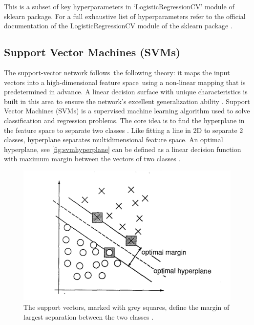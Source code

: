 This is a subset of key hyperparameters in `LogisticRegressionCV' module of sklearn package. For a full exhaustive list of hyperparameters refer to the official documentation of the LogisticRegressionCV module of the sklearn package \citep{sklearn_api}.


\subsection{Support Vector Machines (SVMs)}
The support-vector network follows the following theory: it maps the input vectors into a high-dimensional feature space using a non-linear mapping that is predetermined in advance. A linear decision surface with unique characteristics is built in this area to ensure the network's excellent generalization ability \citep{SVMCortes1995}. 
Support Vector Machines (SVMs) is a supervised machine learning algorithm used to solve classification and regression problems. The core idea is to find the hyperplane in the feature space to separate two classes \citep{Jin2019}. Like fitting a line in 2D to separate 2 classes, hyperplane separates multidimensional feature space. An optimal hyperplane, see \autoref{fig:svmhyperplane} can be defined as a linear decision function with maximum margin between the vectors of two classes \citep{SVMCortes1995}. 
\begin{figure}[H]
    \centering
    \includegraphics[scale=0.4]{images/SVMHyperplane.png}
    \caption{The support vectors, marked with grey squares, define the margin of largest separation between the two classes \citep{SVMCortes1995}.}
    \label{fig:svmhyperplane}
\end{figure}


